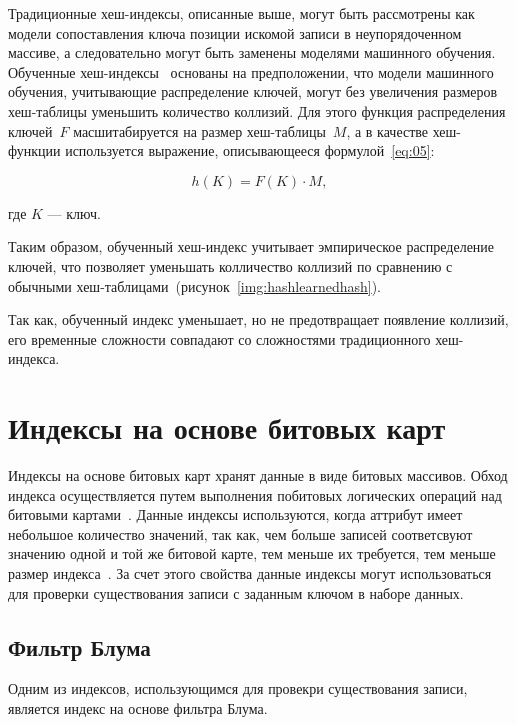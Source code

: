 Традиционные хеш-индексы, описанные выше, могут быть рассмотрены как модели
сопоставления ключа позиции искомой записи в неупорядоченном массиве, а
следовательно могут быть заменены моделями машинного обучения.  Обученные
хеш-индексы~\cite{main} основаны на предположении, что модели машинного
обучения, учитывающие распределение ключей, могут без увеличения размеров
хеш-таблицы уменьшить количество коллизий. Для этого функция распределения
ключей~$F$ масшитабируется на размер хеш-таблицы~$M$, а в качестве хеш-функции
используется выражение, описывающееся формулой~\eqref{eq:05}:

\begin{equation}\label{eq:05}
    h(K) = F(K) \cdot M,
\end{equation}

где $K$ --- ключ.

Таким образом, обученный хеш-индекс учитывает эмпирическое распределение ключей,
что позволяет уменьшать колличество коллизий по сравнению с обычными
хеш-таблицами~(рисунок~\ref{img:hashlearnedhash}).


Так как, обученный индекс уменьшает, но не предотвращает появление коллизий, его
временные сложности совпадают со сложностями традиционного хеш-индекса.

\section{Индексы на основе битовых карт}

Индексы на основе битовых карт хранят данные в виде битовых массивов. Обход
индекса осуществляется путем выполнения побитовых логических операций над
битовыми картами~\cite{loshad}. Данные индексы используются, когда аттрибут
имеет небольшое количество значений, так как, чем больше записей соответсвуют
значению одной и той же битовой карте, тем меньше их требуется, тем меньше
размер индекса~\cite{marvel}. За счет этого свойства данные индексы могут
использоваться для проверки существования записи с заданным ключом в наборе
данных.

\subsection{Фильтр Блума}

Одним из индексов, использующимся для провекри существования записи, является
индекс на основе фильтра Блума.

